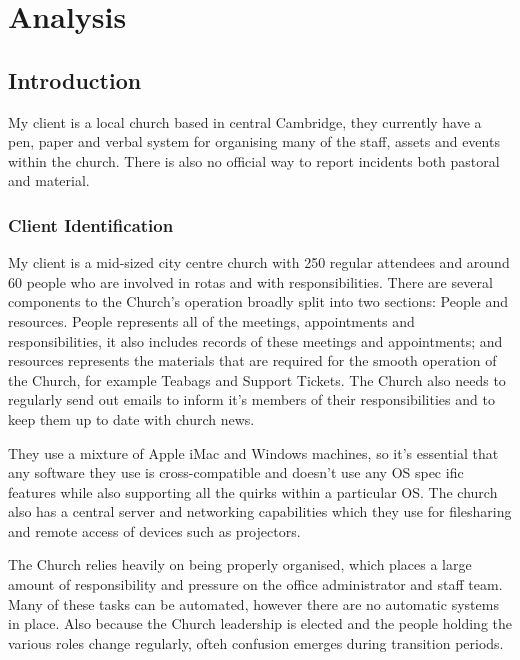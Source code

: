 \chapter{Analysis}

\section{Introduction}
	My client is a local church based in central Cambridge, they currently have a pen, paper and verbal system for organising many of the staff,
	assets and events within the church. There is also no official way to report incidents both pastoral and material.

\subsection{Client Identification}
	My client is a mid-sized city centre church with 250 regular attendees and around 60 people who are involved in rotas and with responsibilities. 
	There are several components to the Church's operation broadly split into two sections: People and resources. People represents all of the meetings, appointments and responsibilities, it also includes records of these meetings and appointments; and resources represents the materials that are required for the smooth operation of the Church, for example Teabags and Support Tickets. The Church also needs to regularly send out emails to inform it's members of their responsibilities and to keep them up to date with church news.

	They use a mixture of Apple iMac and Windows machines, so it's essential that any software they use is cross-compatible and doesn't use any OS spec
	ific features while also supporting all the quirks within a particular OS. The church also has a central server and networking capabilities which they use for filesharing and remote access of devices such as projectors.

	The Church relies heavily on being properly organised, which places a large amount of responsibility and pressure on the office administrator and
	staff team. Many of these tasks can be automated, however there are no automatic systems in place. Also because the Church leadership is elected and the people holding the various roles change regularly, ofteh confusion emerges during transition periods.

